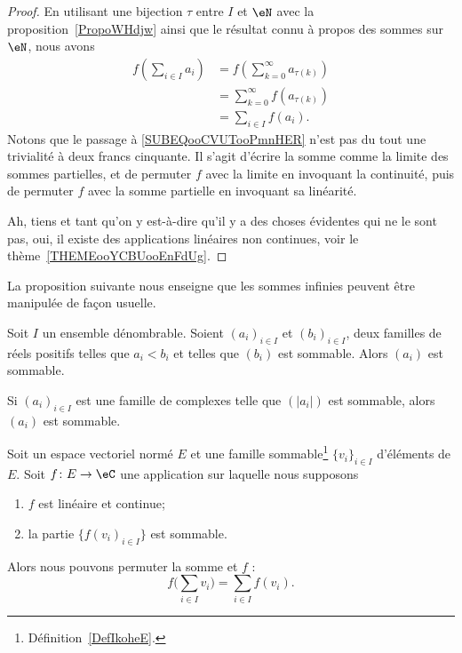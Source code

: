 \begin{proof}
    En utilisant une bijection \( \tau\) entre \( I\) et \( \eN\) avec la proposition~\ref{PropoWHdjw} ainsi que le résultat connu à propos des sommes sur \( \eN\), nous avons
    \begin{subequations}
        \begin{align}
            f\left( \sum_{i\in I}a_i \right)&=f\left( \sum_{k=0}^{\infty}a_{\tau(k)} \right)\\
            &=\sum_{k=0}^{\infty}f(a_{\tau(k)}) \label{SUBEQooCVUTooPmnHER}\\
            &=\sum_{i\in I}f(a_i).
        \end{align}
    \end{subequations}
    Notons que le passage à \eqref{SUBEQooCVUTooPmnHER} n'est pas du tout une trivialité à deux francs cinquante. Il s'agit d'écrire la somme comme la limite des sommes partielles, et de permuter \( f\) avec la limite en invoquant la continuité, puis de permuter \( f\) avec la somme partielle en invoquant sa linéarité.

    Ah, tiens et tant qu'on y est-à-dire qu'il y a des choses évidentes qui ne le sont pas, oui, il existe des applications linéaires non continues, voir le thème~\ref{THEMEooYCBUooEnFdUg}.
\end{proof}

La proposition suivante nous enseigne que les sommes infinies peuvent être manipulée de façon usuelle.
\begin{proposition} \label{PropMpBStL}
    Soit \( I\) un ensemble dénombrable. Soient \( (a_i)_{i\in I}\) et \( (b_i)_{i\in I}\), deux familles de réels positifs telles que \( a_i<b_i\) et telles que \( (b_i)\) est sommable. Alors \( (a_i)\) est sommable.

    Si \( (a_i)_{i\in I}\) est une famille de complexes telle que \( (| a_i |)\) est sommable, alors \( (a_i)\) est sommable.
\end{proposition}

\begin{proposition}     \label{PROPooWLEDooJogXpQ}
    Soit un espace vectoriel normé \( E\) et une famille sommable\footnote{Définition~\ref{DefIkoheE}.} \( \{ v_i \}_{i\in I}\) d'éléments de \( E\). Soit \( f\colon E\to \eC\) une application sur laquelle nous supposons
    \begin{enumerate}
        \item
            \( f\) est linéaire et continue;
        \item
            la partie \( \{ f(v_i)_{i\in I} \} \) est sommable.
    \end{enumerate}
    Alors nous pouvons permuter la somme et \( f\) :
    \begin{equation}        \label{EQooONHXooKqIEbY}
        f\big( \sum_{i\in I}v_i \big)=\sum_{i\in I}f(v_i).
    \end{equation}
\end{proposition}

